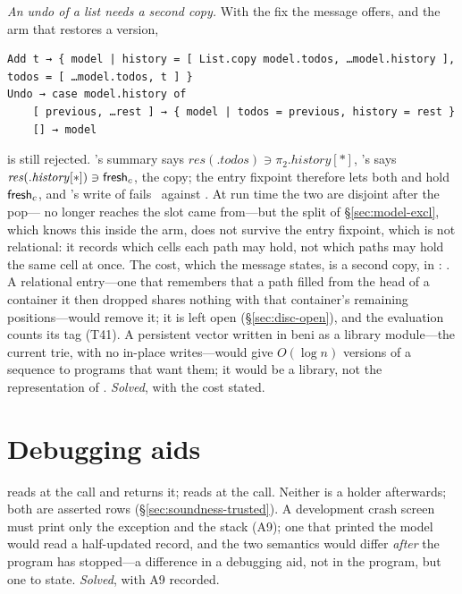 \emph{An undo of a list needs a second copy.} With the fix the message offers, and the  arm
that restores a version,
\begin{Verbatim}
Add t → { model | history = [ List.copy model.todos, …model.history ], todos = [ …model.todos, t ] }
Undo → case model.history of
    [ previous, …rest ] → { model | todos = previous, history = rest }
    [] → model
\end{Verbatim}
is still rejected. 's summary says $\mathit{res}(.\mathit{todos}) \ni \pi_2.\mathit{history}[\ast]$,
's says $\mathit{res}(.\mathit{history}[\ast]) \ni \mathsf{fresh}_c$, the copy; the entry fixpoint therefore
lets both  and  hold $\mathsf{fresh}_c$, and 's write of
 fails \Disjoint\ against . At run time the two are disjoint after
the pop--- no longer reaches the slot  came from---but the split of
\S\ref{sec:model-excl}, which knows this inside the arm, does not survive the entry fixpoint, which is not
relational: it records which cells each path may hold, not which paths may hold the same cell at once. The
cost, which the message states, is a second copy, in : . A
relational entry---one that remembers that a path filled from the head of a container it then dropped
shares nothing with that container's remaining positions---would remove it; it is left open
(\S\ref{sec:disc-open}), and the evaluation counts its tag (T41). A persistent vector written in beni as a
library module---the current trie, with no in-place writes---would give $O(\log n)$ versions of a sequence
to programs that want them; it would be a library, not the representation of . \emph{Solved},
with the cost stated.

\section{Debugging aids}
\label{sec:hard-debug}

 reads  at the call and returns it;  reads at the call.
Neither is a holder afterwards; both are asserted rows (\S\ref{sec:soundness-trusted}). A development
crash screen must print only the exception and the stack (A9); one that printed the model would read a
half-updated record, and the two semantics would differ \emph{after} the program has stopped---a
difference in a debugging aid, not in the program, but one to state. \emph{Solved}, with A9 recorded.

